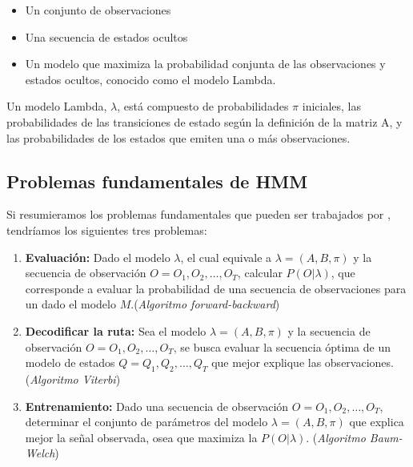 \begin{itemize}
	\menorEspacioItemize
	\item Un conjunto de observaciones
	\item Una secuencia de estados ocultos
	\item Un modelo que maximiza la probabilidad conjunta de las observaciones y estados ocultos, conocido como el modelo Lambda.
\end{itemize}


Un modelo Lambda, $\lambda$, está compuesto de probabilidades $\pi$ iniciales, las probabilidades de las transiciones de estado según la definición de la matriz A, y las probabilidades de los estados que emiten una o más observaciones.








 
\uncm
\subsection{Problemas fundamentales de HMM}

Si resumieramos los problemas fundamentales que pueden ser trabajados por \HMM, tendríamos los siguientes tres problemas:

\begin{enumerate}
	\menorEspacioItemize
	\item \textbf{Evaluación:} Dado el modelo $\lambda$, el cual equivale a $\lambda=(A,B,\pi)$ y la secuencia de observación $O = O_1,O_2,\dots,O_{T}$, calcular $P( O | \lambda)$, que corresponde a evaluar la probabilidad de una secuencia de observaciones para un \HMM dado el modelo $M$.(\emph{Algoritmo forward-backward})


	\item \textbf{Decodificar la ruta:} Sea el modelo $\lambda=(A,B,\pi)$ y la secuencia de observación $O = O_1,O_2,\dots,O_{T}$, se busca evaluar  la secuencia óptima de un modelo de estados $Q = Q_1,Q_2,\dots,Q_{T}$ que mejor explique las observaciones. (\emph{Algoritmo Viterbi})


	\item  \textbf{Entrenamiento:} Dado una secuencia de observación $O = O_1,O_2,\dots,O_{T}$,  determinar el conjunto de parámetros del modelo $\lambda=(A,B,\pi)$ que explica mejor la señal observada, osea que maximiza la $P(O|\lambda)$. (\emph{Algoritmo Baum-Welch})

\end{enumerate}




